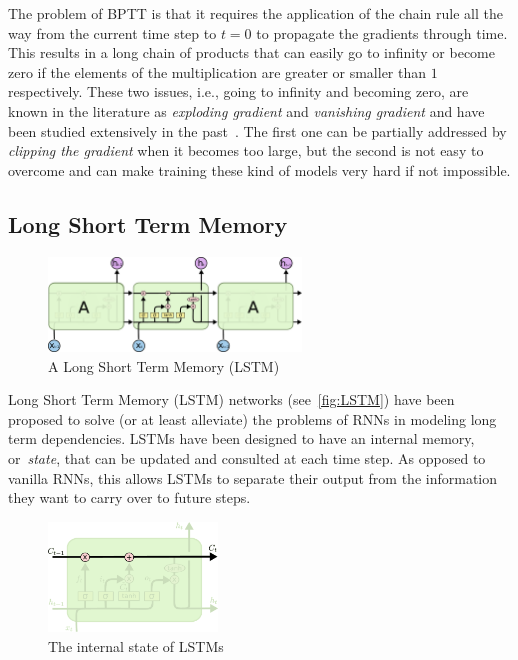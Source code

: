 The problem of BPTT is that it requires the application of the chain rule all
the way from the current time step to $t = 0$ to propagate the gradients
through time.  This results in a long chain of products that can easily go to
infinity or become zero if the elements of the multiplication are greater or
smaller than $1$ respectively. These two issues, i.e., going to infinity and
becoming zero, are known in the literature as \emph{exploding gradient} and
\emph{vanishing gradient} and have been studied extensively in the
past~\citep[see e.g., ][]{Hochreiter91,Bengio-trnn93}. The first one can be
partially addressed by \emph{clipping the gradient} when it becomes too large,
but the second is not easy to overcome and can make training these kind of
models very hard if not impossible.

\subsection{Long Short Term Memory}
\begin{figure}[t]
    \centering
    \includegraphics[width=0.6\textwidth]{pdf/LSTM.pdf}
    \caption{A Long Short Term Memory (LSTM)\label{fig:LSTM}}
\end{figure}

Long Short Term Memory (LSTM) networks (see~\autoref{fig:LSTM}) have been
proposed to solve (or at least alleviate) the problems of RNNs in modeling
long term dependencies. LSTMs have been designed to have an internal memory,
or~\emph{state}, that can be updated and consulted at each time step. As
opposed to vanilla RNNs, this allows LSTMs to separate their output from the
information they want to carry over to future steps.

\begin{figure}[t]
    \centering
    \includegraphics[width=0.4\textwidth]{pdf/LSTM_state.pdf}
    \caption{The internal state of LSTMs\label{fig:LSTM_state}}
\end{figure}

